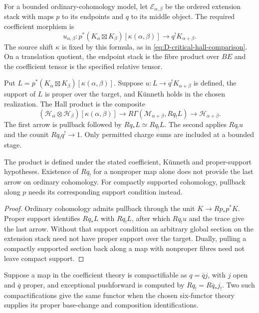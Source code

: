 For a bounded ordinary-cohomology model, let
$\mathcal E_{\alpha,\beta}$ be the ordered extension stack with
maps $p$ to its endpoints and $q$ to its middle object. The
required coefficient morphism is
\[
 u_{\alpha,\beta}:
 p^*(K_\alpha\boxtimes K_\beta)[\kappa(\alpha,\beta)]
 \longrightarrow q^!K_{\alpha+\beta}.
\]
The source shift $\kappa$ is fixed by this formula, as in
\eqref{eq:D-critical-hall-comparison}. On a translation quotient,
the endpoint stack is the fibre product over $BE$ and the
coefficient tensor is the specified relative tensor.

\begin{definition}
\label{def:compact-hall-product}
Put $L=p^*(K_\alpha\boxtimes K_\beta)[\kappa(\alpha,\beta)]$.
Suppose $u:L\to q^!K_{\alpha+\beta}$ is defined, the support
of $L$ is proper over the target, and K\"unneth holds in
the chosen realization. The Hall product is the composite
\[
 (\mathcal H_\alpha\otimes\mathcal H_\beta)
       [\kappa(\alpha,\beta)]
 \longrightarrow R\Gamma(\mathcal M_{\alpha+\beta},Rq_!L)
 \longrightarrow\mathcal H_{\alpha+\beta}.
\]
The first arrow is pullback followed by $Rq_*L\simeq Rq_!L$.
The second applies $Rq_!u$ and the counit $Rq_!q^!\to1$.
Only permitted charge sums are included at a bounded stage.
\end{definition}

\begin{proposition}
\label{prop:finite-hall-product-pullback-existence}
\label{prop:finite-hall-product-pushforward-existence}
The product is defined under the stated coefficient, K\"unneth
and proper-support hypotheses. Existence of $Rq_!$ for a
nonproper map alone does not provide the last arrow on ordinary
cohomology. For compactly supported cohomology, pullback along
$p$ needs its corresponding support condition instead.
\end{proposition}

\begin{proof}
Ordinary cohomology admits pullback through the unit
$K\to Rp_*p^*K$. Proper support identifies $Rq_*L$ with
$Rq_!L$, after which $Rq_!u$ and the trace give the last
arrow. Without that support condition an arbitrary global
section on the extension stack need not have proper support
over the target. Dually, pulling a
compactly supported section back along a map with nonproper
fibres need not leave compact support.
\end{proof}

\begin{proposition}
\label{prop:finite-hall-product-qbang-compactification-independence}
Suppose a map in the coefficient theory is compactifiable as
$q=\overline qj$, with $j$ open and $\overline q$ proper, and
exceptional pushforward is computed by
$Rq_!=R\overline q_*j_!$. Two such compactifications give the
same functor when the chosen six-functor theory supplies its
proper base-change and composition identifications.
\end{proposition}

